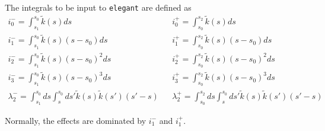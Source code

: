 The integrals to be input to {\tt elegant} are defined as 
\begin{eqnarray}
i_0^- = \int_{s_1}^{s_0} \tilde{k}(s) ds & & i_0^+ = \int_{s_0}^{s_2} \tilde{k}(s) ds \\
i_1^- = \int_{s_1}^{s_0} \tilde{k}(s) (s-s_0) ds & & i_1^+ = \int_{s_0}^{s_2} \tilde{k}(s) (s-s_0) ds \\
i_2^- = \int_{s_1}^{s_0} \tilde{k}(s) (s-s_0)^2 ds & & i_2^+ = \int_{s_0}^{s_2} \tilde{k}(s) (s-s_0)^2 ds \\
i_3^- = \int_{s_1}^{s_0} \tilde{k}(s) (s-s_0)^3 ds & & i_3^+ = \int_{s_0}^{s_2} \tilde{k}(s) (s-s_0)^3 ds \\
\lambda_2^- = \int_{s_1}^{s_0} ds \int_s^{s_0} ds\prime \tilde{k}(s) \tilde{k}(s\prime) (s\prime-s) & & 
\lambda_2^+ = \int_{s_0}^{s_2} ds \int_s^{s_0} ds\prime \tilde{k}(s) \tilde{k}(s\prime) (s\prime-s) 
\end{eqnarray}

Normally, the effects are dominated by $i_1^-$ and $i_1^+$.  
